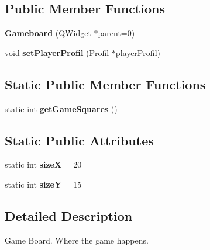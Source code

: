 \subsection*{Public Member Functions}
\begin{DoxyCompactItemize}
\item 
\hypertarget{class_gameboard_a82157069ecfab2d2245b7d5df563aaae}{}{\bfseries Gameboard} (Q\+Widget $\ast$parent=0)\label{class_gameboard_a82157069ecfab2d2245b7d5df563aaae}

\item 
\hypertarget{class_gameboard_a7ac10eb79b85cecff7fdeda1f31e980b}{}void {\bfseries set\+Player\+Profil} (\hyperlink{class_profil}{Profil} $\ast$player\+Profil)\label{class_gameboard_a7ac10eb79b85cecff7fdeda1f31e980b}

\end{DoxyCompactItemize}
\subsection*{Static Public Member Functions}
\begin{DoxyCompactItemize}
\item 
\hypertarget{class_gameboard_aa10ed162ff321f4fe480e531ef352bd8}{}static int {\bfseries get\+Game\+Squares} ()\label{class_gameboard_aa10ed162ff321f4fe480e531ef352bd8}

\end{DoxyCompactItemize}
\subsection*{Static Public Attributes}
\begin{DoxyCompactItemize}
\item 
\hypertarget{class_gameboard_a50499cde2f942a0d18d261a7103e1e2a}{}static int {\bfseries size\+X} = 20\label{class_gameboard_a50499cde2f942a0d18d261a7103e1e2a}

\item 
\hypertarget{class_gameboard_a1a60c1746c1bfa669b3bf7b3dfc6534d}{}static int {\bfseries size\+Y} = 15\label{class_gameboard_a1a60c1746c1bfa669b3bf7b3dfc6534d}

\end{DoxyCompactItemize}


\subsection{Detailed Description}
Game Board. Where the game happens. 

